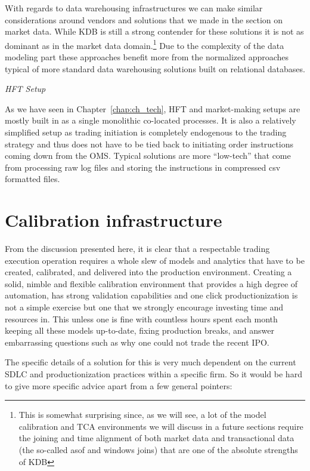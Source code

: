 With regards to data warehousing infrastructures we can make similar considerations around vendors and solutions that we made in the section on market data. While KDB is still a strong contender for these solutions it is not as dominant as in the market data domain.\footnote{This is somewhat surprising since, as we will see, a lot of the model calibration and TCA environments we will discuss in a future sections require the joining and time alignment of both market data and transactional data (the so-called asof and windows joins) that are one of the absolute strengths of KDB} Due to the  complexity of the data modeling part these approaches benefit more from the normalized approaches typical of more standard data warehousing solutions built on relational databases. \twomedskip


\noindent\emph{HFT Setup} \twomedskip


As we have seen in Chapter~\ref{chap:ch_tech}, HFT and market-making setups are mostly built in as a single monolithic co-located processes. It is also a relatively simplified setup as trading initiation is completely endogenous to the trading strategy and thus does not have to be tied back to initiating order instructions coming down from the OMS. Typical solutions are more ``low-tech'' that come from processing raw log files and storing the instructions in compressed csv formatted files.



\section{Calibration infrastructure}


From the discussion presented here, it is clear that a respectable trading execution operation requires a whole slew of models and analytics that have to be created, calibrated, and delivered into the production environment. Creating a solid, nimble and flexible calibration environment that provides a high degree of automation, has strong validation capabilities and one click productionization is not a simple exercise but one that we strongly encourage investing time and resources in. This unless one is fine with countless hours spent each month keeping all these models up-to-date, fixing production breaks, and answer embarrassing questions such as why one could not trade the recent IPO. 


The specific details of a solution for this is very much dependent on the current SDLC and productionization practices within a specific firm. So it would be hard to give more specific advice apart from a few general pointers:

